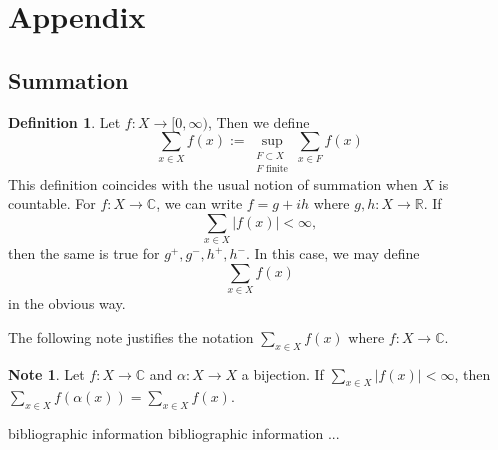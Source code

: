 \documentclass[12pt]{amsart}
\theoremstyle{definition}
\newtheorem{defn}[definition]{Definition}
\newtheorem{note}[definition]{Note}
\newcommand{\al}{\alpha}
\newcommand{\C}{\mathbb{C}}
\newcommand{\R}{\mathbb{R}}
\newcommand{\Rg}{[0,\infty)}
\newcommand{\ld}[1]{\label{defn:#1}}
\begin{document}
	
	
	
	
	
	
	
	
	
	
	
	
	
	
	
	
	
	
	
	
	
	
	
	
	
	
	

	
	

	\newpage
	\section{Appendix}
	
	\subsection{Summation}
	
	\begin{defn} \ld{00000} 
		Let $f:X \rightarrow \Rg$, Then we define $$\sum_{x \in X} f(x) := \sup_{\substack{F \subset X \\ F \text{ finite}}} \sum_{x \in F} f(x)$$ This definition coincides with the usual notion of summation when $X$ is countable. For $f:X \rightarrow \C$, we can write $f = g +ih$ where $g,h:X \rightarrow \R$. If $$\sum_{x \in X}|f(x)| < \infty,$$ then the same is true for $g^+,g^-,h^+,h^-$. In this case, we may define $$\sum_{x \in X} f(x)$$ in the obvious way.
	\end{defn} 
	
	The following note justifies the notation $\sum_{x \in X}f(x)$ where $f:X \rightarrow \C$.
	
	\begin{note}
		Let $f:X \rightarrow \C$ and $\al:X \rightarrow X$ a bijection. If $\sum_{x \in X}|f(x)|< \infty$, then $\sum_{x \in X}f( \al (x)) = \sum_{x \in X}f(x) $.
	\end{note}
	
	\begin{thebibliography}{4}
 bibliographic information
 bibliographic information
...
\end{thebibliography}
	
\end{document}
